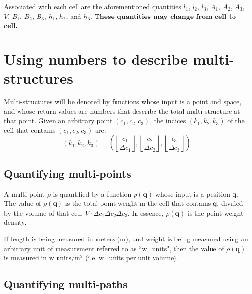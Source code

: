 \documentclass{book}
\begin{document}
Associated with each cell are the aforementioned quantities \(l_1\), \(l_2\), \(l_3\), \(A_1\), \(A_2\), \(A_3\), \(V\), \(B_1\), \(B_2\), \(B_3\), \(h_1\), \(h_2\), and \(h_3\). {\bf These quantities may change from cell to cell.}




\section{Using numbers to describe multi-structures}

Multi-structures will be denoted by functions whose input is a point and space, and whose return values are numbers that describe the total-multi structure at that point. Given an arbitrary point \((c_1, c_2, c_3)\), the indices \((k_1, k_2, k_3)\) of the cell that contains \((c_1, c_2, c_3)\) are:
\[(k_1, k_2, k_3) = \left(\left\lfloor\frac{c_1}{\Delta c_1}\right\rfloor, \left\lfloor\frac{c_2}{\Delta c_2}\right\rfloor, \left\lfloor\frac{c_3}{\Delta c_3}\right\rfloor\right)\] 

\subsection*{Quantifying multi-points}

A multi-point \(\rho\) is quantified by a function \(\rho(\mathbf{q})\) whose input is a position \(\mathbf{q}\). The value of \(\rho(\mathbf{q})\) is the total point weight in the cell that contains \(\mathbf{q}\), divided by the volume of that cell, \(V \cdot \Delta c_1 \Delta c_2 \Delta c_3\). In essence, \(\rho(\mathbf{q})\) is the point weight density.

If length is being measured in meters (m), and weight is being measured using an arbitrary unit of measurement referred to as ``w\_units", then the value of \(\rho(\mathbf{q})\) is measured in \(\text{w\_units}/\text{m}^3\) (i.e. w\_units per unit volume).




\subsection*{Quantifying multi-paths}
\end{document}
